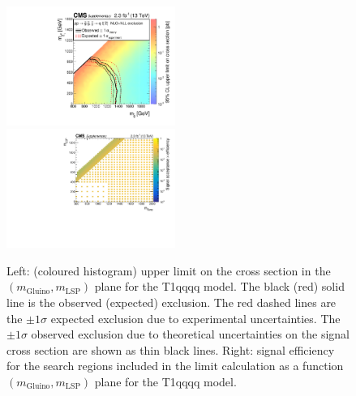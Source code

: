 \clearpage
\begin{figure}[t]
  \begin{center}
    \includegraphics[width=0.49\textwidth]{supplementary/figures/RA1T1qqqqXSEC} \, 
    \includegraphics[width=0.49\textwidth]{supplementary/figures/T1qqqq_merging_4_cats} \,     
  \end{center}
  \caption{Left: (coloured histogram) upper limit on the cross section in the $(m_{\mathrm{Gluino}},m_{\mathrm{LSP}})$ plane for the T1qqqq model. 
  The black (red) solid line is the observed (expected) exclusion. The red dashed lines are the $\pm1\sigma$ expected exclusion due to experimental uncertainties. 
  The $\pm1\sigma$ observed exclusion due to theoretical uncertainties on the signal cross section are shown as thin black lines. 
  Right: signal efficiency for the search regions included in the limit calculation as a function $(m_{\mathrm{Gluino}},m_{\mathrm{LSP}})$ plane for the T1qqqq model. 
  \label{fig:T1qqqq_excl}}
\end{figure}

